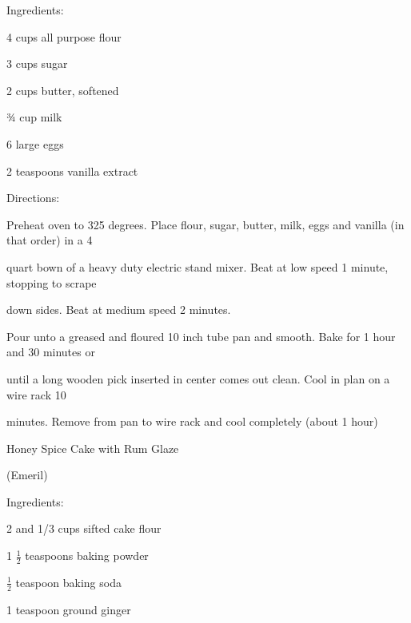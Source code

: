 \documentclass[a4paper,portrait,12pt]{book}
\begin{document}
Ingredients:




4 cups all purpose flour




3 cups sugar




2 cups butter, softened




¾ cup milk




6 large eggs




2 teaspoons vanilla extract




Directions:




Preheat oven to 325 degrees. Place flour, sugar, butter, milk, eggs and vanilla (in that order) in a 4




quart bown of a heavy duty electric stand mixer. Beat at low speed 1 minute, stopping to scrape




down sides. Beat at medium speed 2 minutes.




Pour unto a greased and floured 10 inch tube pan and smooth. Bake for 1 hour and 30 minutes or




until a long wooden pick inserted in center comes out clean. Cool in plan on a wire rack 10




minutes. Remove from pan to wire rack and cool completely (about 1 hour)







\newpage
Honey Spice Cake with Rum Glaze




(Emeril)




Ingredients:




2 and 1/3 cups sifted cake flour




1 $\frac{1}{2}$ teaspoons baking powder




$\frac{1}{2}$ teaspoon baking soda




1 teaspoon ground ginger
\end{document}
